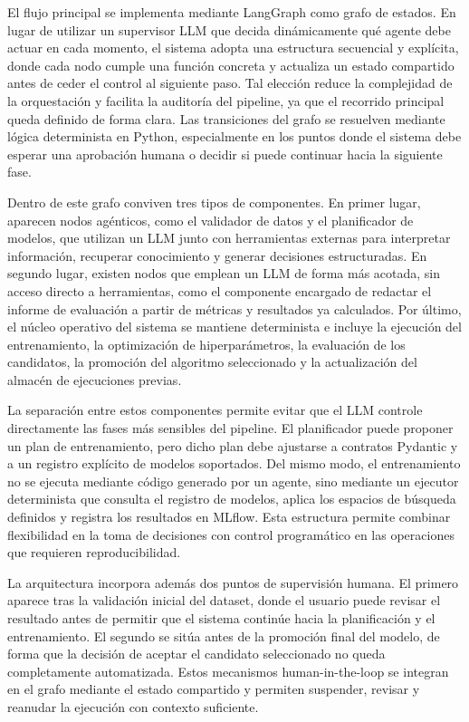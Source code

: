 \documentclass[12pt,a4paper]{article}
\theoremstyle{plain}
\begin{document}
El flujo principal se implementa mediante LangGraph como grafo de estados. En lugar de utilizar un supervisor LLM que decida dinámicamente qué agente debe actuar en cada momento, el sistema adopta una estructura secuencial y explícita, donde cada nodo cumple una función concreta y actualiza un estado compartido antes de ceder el control al siguiente paso. Tal elección reduce la complejidad de la orquestación y facilita la auditoría del pipeline, ya que el recorrido principal queda definido de forma clara. Las transiciones del grafo se resuelven mediante lógica determinista en Python, especialmente en los puntos donde el sistema debe esperar una aprobación humana o decidir si puede continuar hacia la siguiente fase.

Dentro de este grafo conviven tres tipos de componentes. En primer lugar, aparecen nodos agénticos, como el validador de datos y el planificador de modelos, que utilizan un LLM junto con herramientas externas para interpretar información, recuperar conocimiento y generar decisiones estructuradas. En segundo lugar, existen nodos que emplean un LLM de forma más acotada, sin acceso directo a herramientas, como el componente encargado de redactar el informe de evaluación a partir de métricas y resultados ya calculados. Por último, el núcleo operativo del sistema se mantiene determinista e incluye la ejecución del entrenamiento, la optimización de hiperparámetros, la evaluación de los candidatos, la promoción del algoritmo seleccionado y la actualización del almacén de ejecuciones previas.

La separación entre estos componentes permite evitar que el LLM controle directamente las fases más sensibles del pipeline. El planificador puede proponer un plan de entrenamiento, pero dicho plan debe ajustarse a contratos Pydantic y a un registro explícito de modelos soportados. Del mismo modo, el entrenamiento no se ejecuta mediante código generado por un agente, sino mediante un ejecutor determinista que consulta el registro de modelos, aplica los espacios de búsqueda definidos y registra los resultados en MLflow. Esta estructura permite combinar flexibilidad en la toma de decisiones con control programático en las operaciones que requieren reproducibilidad.

La arquitectura incorpora además dos puntos de supervisión humana. El primero aparece tras la validación inicial del dataset, donde el usuario puede revisar el resultado antes de permitir que el sistema continúe hacia la planificación y el entrenamiento. El segundo se sitúa antes de la promoción final del modelo, de forma que la decisión de aceptar el candidato seleccionado no queda completamente automatizada. Estos mecanismos human-in-the-loop se integran en el grafo mediante el estado compartido y permiten suspender, revisar y reanudar la ejecución con contexto suficiente.
\end{document}
